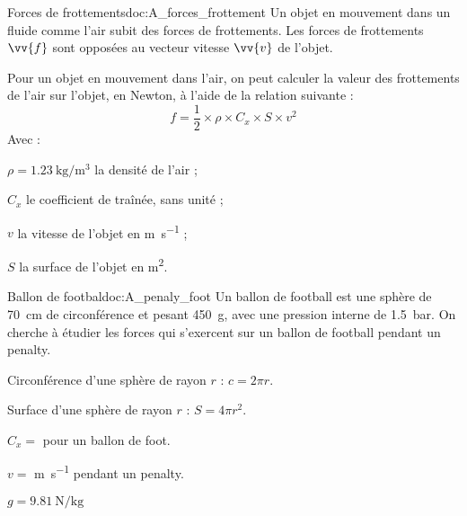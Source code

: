 

\begin{doc}{Forces de frottements}{doc:A_forces_frottement}
  Un objet en mouvement dans un fluide comme l'air subit des forces de frottements.
  Les forces de frottements $\vv{f}$ sont opposées au vecteur vitesse $\vv{v}$ de l'objet.
  
  Pour un objet en mouvement dans l'air, on peut calculer la valeur des frottements de l'air sur l'objet, en Newton, à l'aide de la relation suivante : 
  \begin{equation*}
    f = \dfrac{1}{2} \times \rho \times C_x \times S \times v^2
  \end{equation*}
  Avec :
  \begin{listePoints}[2]
    \item $\rho = \qty{1,23}{\kg\per\cubic\m}$ la densité de l'air ;
    \item $C_x$ le coefficient de traînée, sans unité ;
    \item $v$ la vitesse de l'objet en \unit{\m\per\s} ;
    \item $S$ la surface de l'objet en \unit{\m\squared}.
  \end{listePoints}
\end{doc}

\begin{doc}{Ballon de footbal}{doc:A_penaly_foot}
  Un ballon de football est une sphère de \qty{70}{\cm} de circonférence et pesant \qty{450}{\g}, avec une pression interne de \qty{1,5}{\bar}.  
  On cherche à étudier les forces qui s'exercent sur un ballon de football pendant un penalty.
  
  \begin{donnees}
    \item Circonférence d'une sphère de rayon $r$ : $c = 2\pi r$.
    \item Surface d'une sphère de rayon $r$ : $S = 4\pi r^2$.
    \item $C_x =$  pour un ballon de foot.
    \item $v =$ \unit{\m\per\s} pendant un penalty.
    \item $g = \qty{9.81}{\newton\per\kg}$
  \end{donnees}
\end{doc}



